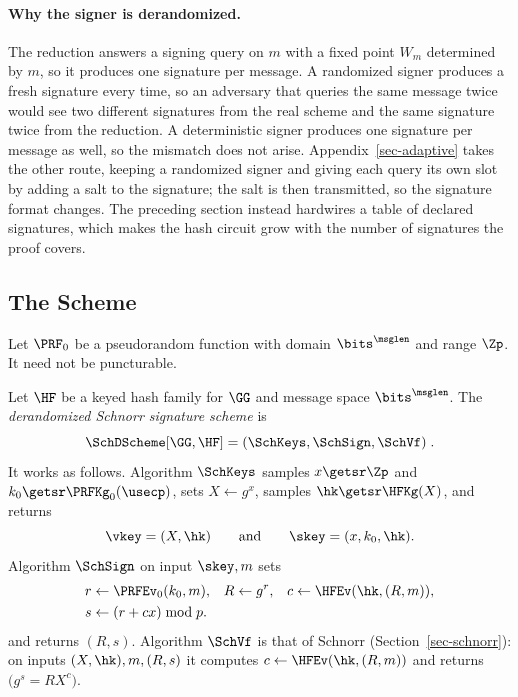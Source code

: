 \paragraph*{Why the signer is derandomized.} The reduction answers a signing query on $m$ with a fixed point $W_m$ determined by $m$, so it produces one signature per message. A randomized signer produces a fresh signature every time, so an adversary that queries the same message twice would see two different signatures from the real scheme and the same signature twice from the reduction. A deterministic signer produces one signature per message as well, so the mismatch does not arise. Appendix~\ref{sec-adaptive} takes the other route, keeping a randomized signer and giving each query its own slot by adding a salt to the signature; the salt is then transmitted, so the signature format changes. The preceding section instead hardwires a table of declared signatures, which makes the hash circuit grow with the number of signatures the proof covers.

\subsection{The Scheme} \label{sec-derand-scheme}

Let $\PRF_0$ be a pseudorandom function with domain $\bits^{\msglen}$ and range $\Zp$. It need not be puncturable.

\begin{construction} \label{constr-derand}
Let $\HF$ be a keyed hash family for $\GG$ and message space $\bits^{\msglen}$. The \emph{derandomized Schnorr signature scheme} is
$$
\SchDScheme[\GG,\HF] = (\SchKeys,\SchSign,\SchVf) \;.
$$
It works as follows. Algorithm $\SchKeys$ samples $x\getsr\Zp$ and $k_0\getsr\PRFKg_0(\usecp)$, sets $X\gets g^x$, samples $\hk\getsr\HFKg(X)$, and returns
$$
\vkey=(X,\hk)
\qquad\text{and}\qquad
\skey=(x,k_0,\hk).
$$
Algorithm $\SchSign$ on input $\skey,m$ sets
$$
\begin{aligned}
r &\gets \PRFEv_0(k_0,m),
& R &\gets g^{r},
& c &\gets \HFEv(\hk,(R,m)),\\
s &\gets (r+cx)\bmod p.
\end{aligned}
$$
and returns $(R,s)$. Algorithm $\SchVf$ is that of Schnorr (Section~\ref{sec-schnorr}): on inputs $(X,\hk),m,(R,s)$ it computes $c \gets \HFEv(\hk,(R,m))$ and returns $\big(g^s = RX^c\big)$.
\end{construction}

